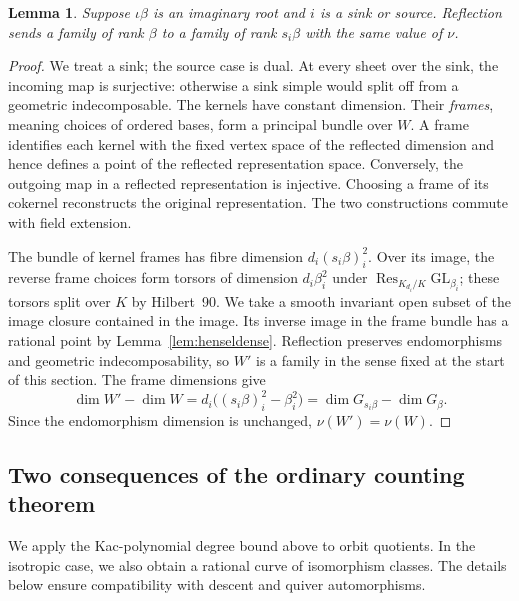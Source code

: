 \documentclass[11pt, reqno]{amsart}
\numberwithin{equation}{section}
\newtheorem{lemma}[theorem]{Lemma}
\theoremstyle{definition}
\theoremstyle{remark}
\newcommand{\op}[1]{\operatorname{#1}}
\newcommand{\mr}[1]{\mathrm{#1}}
\newcommand{\Res}{\op{Res}}
\begin{document}
\begin{lemma}\label{lem:family-reflection}
Suppose $\iota\beta$ is an imaginary root and $i$ is a sink or source.
Reflection sends a family of rank $\beta$ to a family of rank
$s_i\beta$ with the same value of $\nu$.
\end{lemma}
\begin{proof}
We treat a sink; the source case is dual. At every sheet over the
sink, the incoming map is surjective: otherwise a sink simple would
split off from a geometric indecomposable. The kernels have constant
dimension. Their \emph{frames}, meaning choices of ordered bases,
form a principal bundle over $W$. A frame identifies each kernel with the fixed vertex
space of the reflected dimension and hence defines a point of the
reflected representation space. Conversely, the outgoing map in a
reflected representation is injective. Choosing a frame of its
cokernel reconstructs the original representation. The two constructions commute with field extension.

The bundle of kernel frames has fibre dimension $d_i(s_i\beta)_i^2$.
Over its image, the reverse frame choices form torsors of dimension
$d_i\beta_i^2$ under $\Res_{K_{d_i}/K}\mr{GL}_{\beta_i}$;
these torsors split over $K$ by Hilbert~90. We take a smooth invariant
open subset of the image closure contained in the image. Its inverse
image in the frame bundle has a rational point by
Lemma~\ref{lem:henseldense}. Reflection preserves endomorphisms and
geometric indecomposability, so $W'$ is a family in the sense fixed
at the start of this section. The frame dimensions give
\[ \dim W'-\dim W=d_i\bigl((s_i\beta)_i^2-\beta_i^2\bigr) =\dim G_{s_i\beta}-\dim G_\beta. \]
Since the endomorphism dimension is unchanged, $\nu(W')=\nu(W)$.
\end{proof}

\subsection{Two consequences of the ordinary counting theorem}

We apply the Kac-polynomial degree bound above to orbit quotients.
In the isotropic case, we also obtain a rational curve of
isomorphism classes. The details below ensure compatibility with
descent and quiver automorphisms.
\end{document}
